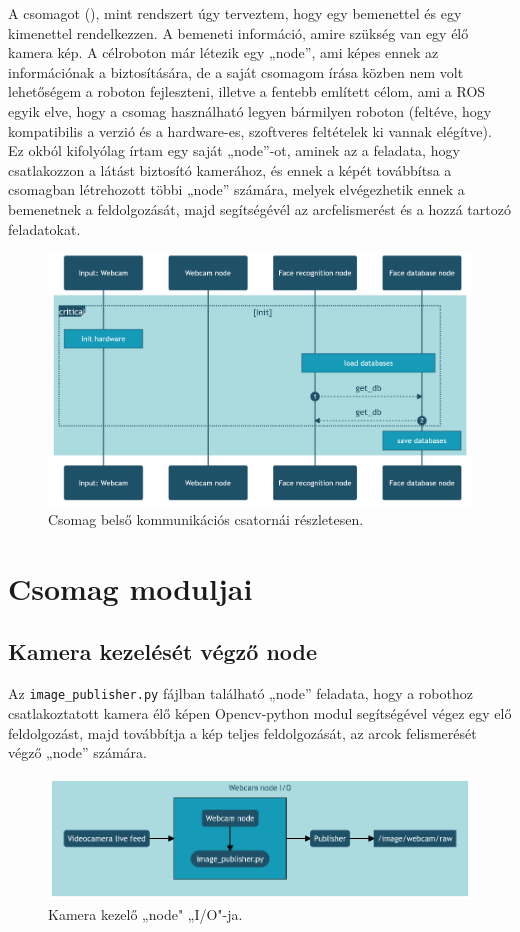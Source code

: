A csomagot (), mint rendszert úgy terveztem, hogy egy bemenettel és egy kimenettel rendelkezzen. A bemeneti információ, amire szükség van egy élő kamera kép. A célroboton már létezik egy „node”, ami képes ennek az információnak a biztosítására, de a saját csomagom írása közben nem volt lehetőségem a roboton fejleszteni, illetve a fentebb említett célom, ami a ROS egyik elve, hogy a csomag használható legyen bármilyen roboton (feltéve, hogy kompatibilis a verzió és a hardware-es, szoftveres feltételek ki vannak elégítve). Ez okból kifolyólag írtam egy saját „node”-ot, aminek az a feladata, hogy csatlakozzon a látást biztosító kamerához, és ennek a képét továbbítsa a csomagban létrehozott többi „node” számára, melyek elvégezhetik ennek a bemenetnek a feldolgozását, majd segítségévél az arcfelismerést és a hozzá tartozó feladatokat.

\begin{figure}[!ht]
    \centering
    \includegraphics[width=155mm, keepaspectratio]{02_mermaid/full_init2.png}
    \caption{Csomag belső kommunikációs csatornái részletesen.}
    \label{fig:fullcomm}
\end{figure}

\clearpage
\section{Csomag moduljai}
\label{sec:modules}
    \subsection{Kamera kezelését végző node}
Az \verb|image_publisher.py| fájlban található „node” feladata, hogy a robothoz csatlakoztatott kamera élő képen Opencv-python modul segítségével végez egy elő feldolgozást, majd továbbítja a kép teljes feldolgozását, az arcok felismerését végző „node” számára.
\begin{figure}[!ht]
    \centering
    \includegraphics[width=125mm, keepaspectratio]{02_mermaid/mermaid10_wc_io.png}
    \caption{Kamera kezelő „node" „I/O"-ja.}
    \label{fig:wcio}
\end{figure}

